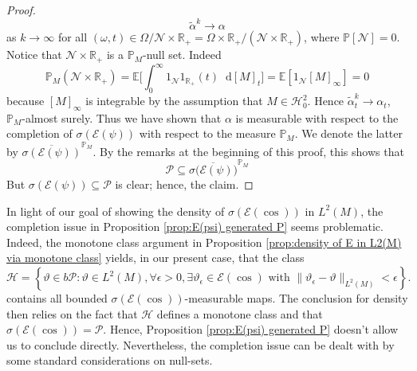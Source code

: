 \documentclass[11pt,a4paper,twoside,openany]{report}
\numberwithin{equation}{section}
\newcommand{\diff}{\mathop{}\!\mathrm{d}}
\theoremstyle{plain} %
\theoremstyle{definition} %
\theoremstyle{remark} %
\begin{document}
\begin{proof}
    \begin{equation*}
        \widetilde{\alpha}^{k}\to\alpha
    \end{equation*}
    as \(k\to \infty\) 
    for all \((\omega,t)\in\Omega/\mathcal{N}\times\mathbb{R}_+=\Omega\times\mathbb{R}_+/(\mathcal{N}\times \mathbb{R}_+)\), where \(\mathbb{P}[\mathcal{N}]=0\). Notice that  \(\mathcal{N}\times\mathbb{R}_+\) is a \(\mathbb{P}_M\)-null set. Indeed 
    \begin{equation*}
        \mathbb{P}_M(\mathcal{N}\times\mathbb{R}_+)=\mathbb{E}\bigg[\int_0^{\infty}1_\mathcal{N}1_{\mathbb{R}_+}(t)\diff [M]_t\bigg]=\mathbb{E}[1_\mathcal{N}[M]_{\infty}]=0
    \end{equation*}
    because \([M]_{\infty}\) is integrable by the assumption that \(M\in\mathcal{H}_{0}^2\). Hence \(\widetilde{\alpha}_t^k\to \alpha_t\), \(\mathbb{P}_M\)-almost surely. Thus we have shown that \(\alpha\) is measurable with respect to the completion of \(\sigma(\mathcal{E}(\psi))\) with respect to the measure \(\mathbb{P}_M\). We denote the latter by \(\overline{\sigma(\mathcal{E}(\psi))}^{\mathbb{P}_M}\). By the remarks at the beginning of this proof, this shows that 
     \begin{equation*}
        \mathcal{P}\subseteq\overline{\sigma\big(\mathcal{E}(\psi)\big)}^{\mathbb{P}_M}
    \end{equation*}
    But \(\sigma(\mathcal{E}(\psi))\subseteq\mathcal{P}\) is clear; hence, the claim. 
\end{proof}
In light of our goal of showing the density of \(\sigma(\mathcal{E}(\cos))\) in \(L^2(M)\), the completion issue in Proposition \ref{prop:E(psi) generated P} seems problematic. Indeed, the monotone class argument in Proposition \ref{prop:density of E in L2(M) via monotone class} yields, in our present case, that the class 
\begin{equation*}
     \mathcal{H}=\left\{ \vartheta\in b\mathcal{P}:\vartheta\in L^2(M),\forall \epsilon>0, \exists \vartheta_{\epsilon}\in \mathcal{E}(\cos)\text{ with }\lVert \vartheta_{\epsilon}-\vartheta\rVert_{L^2(M)}<\epsilon\right\}.
\end{equation*}
contains all bounded \(\sigma(\mathcal{E}(\cos))\)-measurable maps. The conclusion for density then relies on the fact that \(\mathcal{H}\) defines a monotone class and that \(\sigma(\mathcal{E}(\cos))=\mathcal{P}\).  Hence, Proposition \ref{prop:E(psi) generated P} doesn't allow us to conclude directly. Nevertheless, the completion issue can be dealt with by some standard considerations on null-sets.
\end{document}
